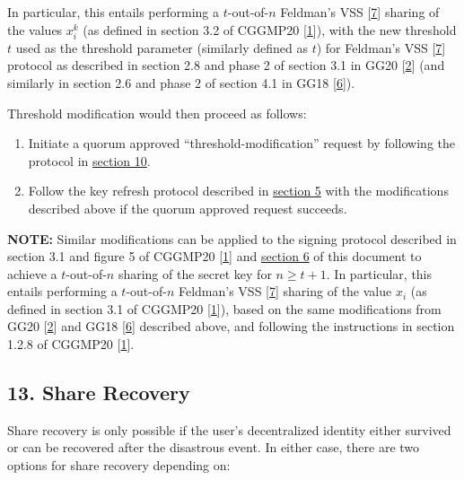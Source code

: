 \documentclass[
]{article}
\providecommand{\tightlist}{%
  \setlength{\itemsep}{0pt}\setlength{\parskip}{0pt}}
\begin{document}
In particular, this entails performing a \(t\)-out-of-\(n\) Feldman's
VSS {[}\protect\hyperlink{ref-feldman-vss}{7}{]} sharing of the values
\(x_i^k\) (as defined in section 3.2 of CGGMP20
{[}\protect\hyperlink{ref-cggmp20}{1}{]}), with the new threshold \(t\)
used as the threshold parameter (similarly defined as \(t\)) for
Feldman's VSS {[}\protect\hyperlink{ref-feldman-vss}{7}{]} protocol as
described in section 2.8 and phase 2 of section 3.1 in GG20
{[}\protect\hyperlink{ref-gg20}{2}{]} (and similarly in section 2.6 and
phase 2 of section 4.1 in GG18 {[}\protect\hyperlink{ref-gg18}{6}{]}).

Threshold modification would then proceed as follows:

\begin{enumerate}
\def\labelenumi{\arabic{enumi}.}
\tightlist
\item
  Initiate a quorum approved ``threshold-modification'' request by
  following the protocol in
  \protect\hyperlink{quorum-approved-request}{section 10}.
\item
  Follow the key refresh protocol described in
  \protect\hyperlink{key-refresh}{section 5} with the modifications
  described above if the quorum approved request succeeds.
\end{enumerate}

\textbf{NOTE:} Similar modifications can be applied to the signing
protocol described in section 3.1 and figure 5 of CGGMP20
{[}\protect\hyperlink{ref-cggmp20}{1}{]} and
\protect\hyperlink{signing}{section 6} of this document to achieve a
\(t\)-out-of-\(n\) sharing of the secret key for \(n \geq t+1\). In
particular, this entails performing a \(t\)-out-of-\(n\) Feldman's VSS
{[}\protect\hyperlink{ref-feldman-vss}{7}{]} sharing of the value
\(x_i\) (as defined in section 3.1 of CGGMP20
{[}\protect\hyperlink{ref-cggmp20}{1}{]}), based on the same
modifications from GG20 {[}\protect\hyperlink{ref-gg20}{2}{]} and GG18
{[}\protect\hyperlink{ref-gg18}{6}{]} described above, and following the
instructions in section 1.2.8 of CGGMP20
{[}\protect\hyperlink{ref-cggmp20}{1}{]}.

\hypertarget{share-recovery}{%
\subsection{13. Share Recovery}\label{share-recovery}}

Share recovery is only possible if the user's decentralized identity
either survived or can be recovered after the disastrous event. In
either case, there are two options for share recovery depending on:
\end{document}
